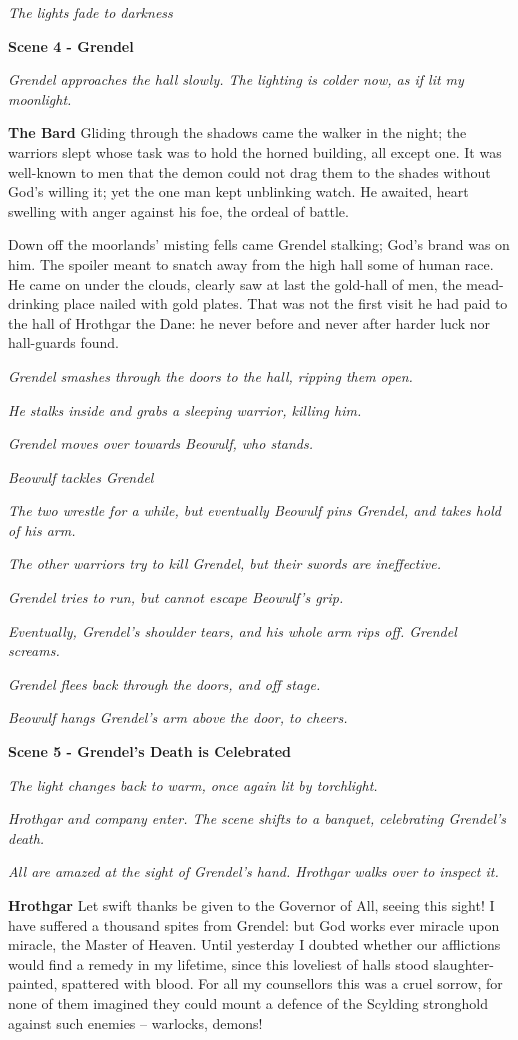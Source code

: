 \documentclass[a4paper]{article}
\begin{document}
{\centerline{\textit{The lights fade to darkness}}

\centerline{\textbf{Scene 4 - Grendel}}
\centerline{\textit{Grendel approaches the hall slowly. The lighting is colder now, as if lit my moonlight.}}

\textbf{The Bard} Gliding through the shadows came
the walker in the night; the warriors slept
whose task was to hold the horned building,
all except one. It was well-known to men
that the demon could not drag them to the shades
without God’s willing it; yet the one man kept
unblinking watch. He awaited, heart swelling
with anger against his foe, the ordeal of battle.

Down off the moorlands’ misting fells came
Grendel stalking; God’s brand was on him.
The spoiler meant to snatch away
from the high hall some of human race.
He came on under the clouds, clearly saw at last
the gold-hall of men, the mead-drinking place
nailed with gold plates. That was not the first visit
he had paid to the hall of Hrothgar the Dane:
he never before and never after
harder luck nor hall-guards found.

\centerline{\textit{Grendel smashes through the doors to the hall, ripping them open.}}
\centerline{\textit{He stalks inside and grabs a sleeping warrior, killing him.}}
\centerline{\textit{Grendel moves over towards Beowulf, who stands.}}

\centerline{\textit{Beowulf tackles Grendel}}
\centerline{\textit{The two wrestle for a while, but eventually Beowulf pins Grendel, and takes hold of his arm.}}
\centerline{\textit{The other warriors try to kill Grendel, but their swords are ineffective.}}
\centerline{\textit{Grendel tries to run, but cannot escape Beowulf's grip.}}
\centerline{\textit{Eventually, Grendel's shoulder tears, and his whole arm rips off. Grendel screams.}}
\centerline{\textit{Grendel flees back through the doors, and off stage.}}
\centerline{\textit{Beowulf hangs Grendel's arm above the door, to cheers.}}

\centerline{\textbf{Scene 5 - Grendel's Death is Celebrated}}
\centerline{\textit{The light changes back to warm, once again lit by torchlight.}}
\centerline{\textit{Hrothgar and company enter. The scene shifts to a banquet, celebrating Grendel's death.}}
\centerline{\textit{All are amazed at the sight of Grendel's hand. Hrothgar walks over to inspect it.}}

\textbf{Hrothgar} Let swift thanks be given to the Governor of All,
seeing this sight! I have suffered a thousand
spites from Grendel: but God works ever
miracle upon miracle, the Master of Heaven.
Until yesterday I doubted whether
our afflictions would find a remedy
in my lifetime, since this loveliest of halls
stood slaughter-painted, spattered with blood.
For all my counsellors this was a cruel sorrow,
for none of them imagined they could mount a defence
of the Scylding stronghold against such enemies –
warlocks, demons!

}
\end{document}
